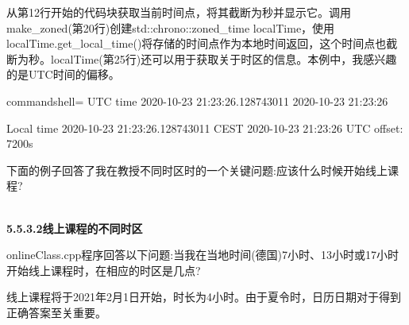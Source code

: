 从第12行开始的代码块获取当前时间点，将其截断为秒并显示它。调用make\_zoned(第20行)创建std::chrono::zoned\_time localTime，使用localTime.get\_local\_time()将存储的时间点作为本地时间返回，这个时间点也截断为秒。localTime(第25行)还可以用于获取关于时区的信息。本例中，我感兴趣的是UTC时间的偏移。

\begin{tcblisting}{commandshell={}}
UTC time
  2020-10-23 21:23:26.128743011
  2020-10-23 21:23:26
  
Local time
  2020-10-23 21:23:26.128743011 CEST
  2020-10-23 21:23:26
  UTC offset: 7200s
\end{tcblisting}

下面的例子回答了我在教授不同时区时的一个关键问题:应该什么时候开始线上课程?

\hspace*{\fill} \\ %
\noindent
\textbf{5.5.3.2\hspace{0.2cm}线上课程的不同时区}

onlineClass.cpp程序回答以下问题:当我在当地时间(德国)7小时、13小时或17小时开始线上课程时，在相应的时区是几点?

线上课程将于2021年2月1日开始，时长为4小时。由于夏令时，日历日期对于得到正确答案至关重要。

